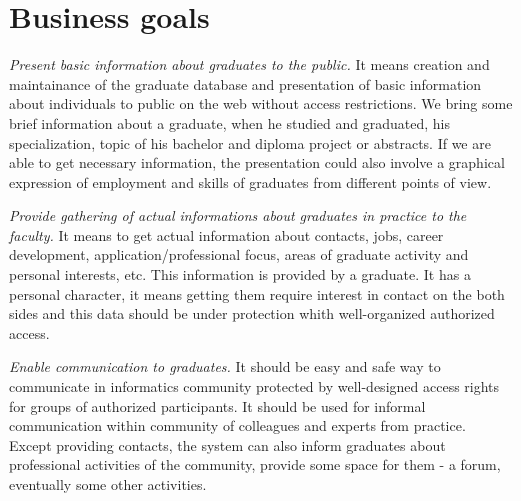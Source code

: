 \documentclass{iitsrc}[2006/14/02]
\begin{document}

\section{Business goals}

{\em Present basic information about graduates to the public.}
It means creation and maintainance of the graduate database and presentation of basic information about individuals to public on the web without access restrictions. We bring some brief information about a graduate, when he studied and graduated, his specialization, topic of his bachelor and diploma project or abstracts. If we are able to get necessary information, the presentation could also involve a graphical expression of employment and skills of graduates from different points of view.

{\em Provide gathering of actual informations about graduates in practice to the faculty.} 
It means to get actual information about contacts, jobs, career development, application/professional focus, areas of graduate activity and personal interests, etc. This information is provided by a graduate. It has a personal character, it means getting them require interest in contact on the both sides and this data should be under protection whith well-organized authorized access.

{\em Enable communication to graduates.}
It should be easy and safe way to communicate in informatics community protected by well-designed access rights for groups of authorized participants. It should be used for informal communication within community of colleagues and experts from practice. Except providing contacts, the system can also inform graduates about professional activities of the community, provide some space for them - a forum, eventually some other activities.
\end{document}
